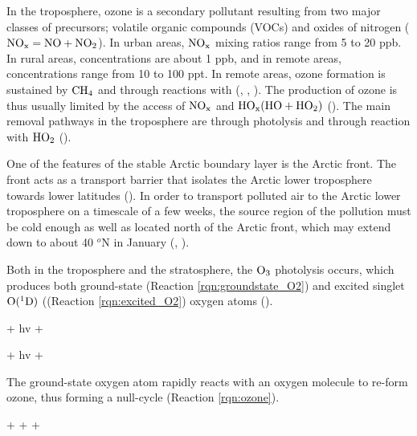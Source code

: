 \medskip

In the troposphere, ozone is a secondary pollutant resulting from two major classes of precursors; volatile organic compounds (VOCs) and oxides of nitrogen ($\mathrm{NO_x} = \mathrm{NO} + \mathrm{NO_2}$). In urban areas, $\mathrm{NO_x}$ mixing ratios range from 5 to 20 ppb. In rural areas, concentrations are about 1 ppb, and in remote areas, concentrations range from 10 to 100 ppt. In remote areas, ozone formation is sustained by $\mathrm{CH_4}$ and  through reactions with  (\cite{Cadle1970}, \cite{Levy1971}, \cite{SeinfeldSpyros}). The production of ozone is thus usually limited by the access of $\mathrm{NO_x}$ and $\mathrm{HO_x} (\mathrm{HO} + \mathrm{HO_2})$ (\cite{Levy1971}). The main removal pathways in the troposphere are through photolysis and through reaction with $\mathrm{HO_2}$ (\cite{SeinfeldSpyros}).

\medskip

One of the features of the stable Arctic boundary layer is the Arctic front. The front acts as a transport barrier that isolates the Arctic lower troposphere towards lower latitudes (\cite{BARRIE1986643}). In order to transport polluted air to the Arctic lower troposphere on a timescale of a few weeks, the source region of the pollution must be cold enough as well as located north of the Arctic front, which may extend down to about 40 $^o$N in January (\cite{BARRIE1986643}, \cite{AMAP2015}). 


\medskip

Both in the troposphere and the stratosphere, the $\mathrm{O_3}$ photolysis occurs, which produces both ground-state  (Reaction \ref{rqn:groundstate_O2}) and excited singlet $\mathrm{O(^1D)}$ ((Reaction \ref{rqn:excited_O2}) oxygen atoms (\cite{SeinfeldSpyros}).

\begin{reaction}
     + hv \rightarrow {} + 
    \label{rqn:groundstate_O2}
\end{reaction}

\begin{reaction}
     + hv \rightarrow {} + 
    \label{rqn:excited_O2}
\end{reaction}

The ground-state oxygen atom rapidly reacts with an oxygen molecule to re-form ozone, thus forming a null-cycle (Reaction \ref{rqn:ozone}).

\begin{reaction}
     +  +  \rightarrow {} + 
    \label{rqn:ozone}
\end{reaction}

